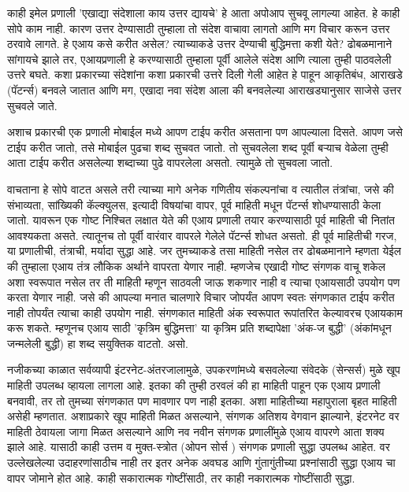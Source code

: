 काही इमेल प्रणाली  'एखाद्या संदेशाला काय उत्तर द्यायचे' हे आता अपोआप सुचवू लागल्या आहेत. हे काही सोपे काम नाही. कारण उत्तर देण्यासाठी तुम्हाला तो संदेश वाचावा लागतो आणि मग विचार करून उत्तर ठरवावे लागते. हे एआय कसे करीत असेल? त्याच्याकडे उत्तर देण्याची बुद्धिमत्ता कशी येते? ढोबळमानाने सांगायचे झाले तर, एआयप्रणाली हे करण्यासाठी तुम्हाला पूर्वी आलेले संदेश आणि त्याला तुम्ही पाठवलेली उत्तरे बघते. कशा प्रकारच्या संदेशांना कशा प्रकारची उत्तरे दिली गेली आहेत हे पाहून आकृतिबंध, आराखडे (पॅटर्न्स) बनवले जातात आणि मग, एखादा नवा संदेश आला की बनवलेल्या आराखड्यानुसार साजेसे उत्तर सुचवले जाते.

अशाच प्रकारची एक प्रणाली मोबाईल  मध्ये आपण टाईप करीत असताना पण आपल्याला दिसते. आपण जसे टाईप करीत जातो, तसे मोबाईल  पुढचा शब्द सुचवत जातो. तो सुचवलेला शब्द पूर्वी बऱ्याच वेळेला तुम्ही आता टाईप करीत असलेल्या शब्दाच्या पुढे वापरलेला असतो. त्यामुळे तो सुचवला जातो.

वाचताना हे सोपे वाटत असले तरी त्याच्या मागे अनेक गणितीय संकल्पनांचा व त्यातील तंत्रांचा, जसे की  संभाव्यता, सांख्यिकी कॅल्क्युलस, इत्यादी विषयांचा वापर,  पूर्व माहिती मधून पॅटर्न्स  शोधण्यासाठी केला जातो. यावरून एक गोष्ट निश्चित लक्षात येते की एआय प्रणाली तयार करण्यासाठी पूर्व माहिती ची नितांत आवश्यकता असते. त्यातूनच तो पूर्वी वारंवार वापरले गेलेले पॅटर्न्स  शोधत असतो. ही पूर्व माहितीची गरज, या प्रणालीची, तंत्राची, मर्यादा सुद्धा आहे. जर तुमच्याकडे तसा माहिती नसेल तर ढोबळमानाने म्हणता येईल की तुम्हाला एआय तंत्र लौकिक अर्थाने वापरता येणार नाही. म्हणजेच एखादी गोष्ट संगणक वाचू शकेल अशा स्वरूपात नसेल तर ती माहिती म्हणून साठवली जाऊ शकणार नाही व त्याचा एआयसाठी उपयोग पण करता येणार नाही. जसे की आपल्या मनात चालणारे विचार जोपर्यंत आपण स्वतः संगणकात टाईप करीत नाही तोपर्यंत त्याचा काही उपयोग नाही. संगणकात माहिती अंक स्वरूपात रूपांतरित केल्यावरच एआयकाम करू शकते. म्हणूनच एआय साठी 'कृत्रिम बुद्धिमत्ता' या कृत्रिम प्रति शब्दापेक्षा 'अंक-ज बुद्धी' (अंकांमधून जन्मलेली बुद्धी) हा शब्द सयुक्तिक वाटतो. असो.

नजीकच्या काळात सर्वव्यापी इंटरनेट-अंतरजालामुळे, उपकरणांमध्ये बसवलेल्या संवेदके (सेन्सर्स)  मुळे खूप माहिती उपलब्ध व्हायला लागला आहे. इतका की तुम्ही ठरवलं की हा माहिती पाहून एक एआय प्रणाली बनवावी, तर तो तुमच्या संगणकात पण मावणार पण नाही इतका. अशा माहितीच्या महापुराला बृहत माहिती असेही म्हणतात. अशाप्रकारे खूप माहिती मिळत असल्याने, संगणक अतिशय वेगवान झाल्याने, इंटरनेट वर माहिती ठेवायला जागा मिळत असल्याने आणि नव नवीन संगणक प्रणालींमुळे एआय वापरणे आता शक्य झाले आहे. यासाठी काही उत्तम व मुक्त-स्त्रोत (ओपन सोर्स ) संगणक प्रणाली सुद्धा उपलब्ध आहेत. वर उल्लेखलेल्या उदाहरणांसाठीच नाही तर इतर अनेक अवघड आणि गुंतागुंतीच्या प्रश्नांसाठी सुद्धा एआय चा वापर जोमाने होत आहे. काही सकारात्मक गोष्टींसाठी, तर काही नकारात्मक गोष्टींसाठी सुद्धा.

